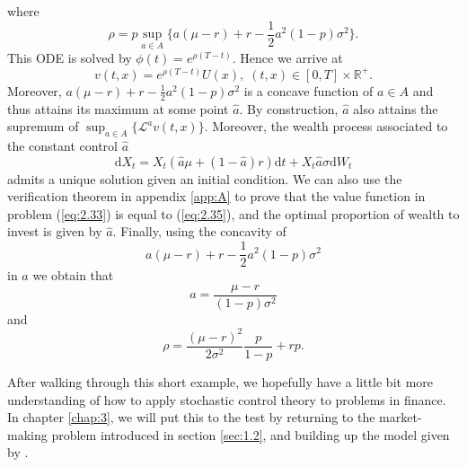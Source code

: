 where 
\begin{equation*}
    \rho=p\sup_{a\in A}\{a(\mu-r)+r-\frac{1}{2}a^2(1-p)\sigma^2\}.
\end{equation*}
This ODE is solved by $\phi(t)=e^{\rho(T-t)}$. Hence we arrive at 
\begin{equation}\label{eq:2.36}
    v(t,x)=e^{\rho(T-t)}U(x),\;(t,x)\in[0,T]\times\mathbb{R}^+.
\end{equation}
Moreover, $a(\mu-r)+r-\frac{1}{2}a^2(1-p)\sigma^2$ is a concave function of $a\in A$
and thus attains its maximum at some point $\hat a$. By construction, $\hat a$ also
attains the supremum of $\sup_{a\in A}\{\mathcal{L}^av(t,x)\}$. Moreover, the wealth
process associated to the constant control $\hat a$
\begin{equation*}
    \mathrm dX_t=X_t(\hat a\mu+(1-\hat a)r)\mathrm dt+X_t\hat a\sigma\mathrm dW_t
\end{equation*}
admits a unique solution given an initial condition. We can also use the verification 
theorem in appendix \ref{app:A} to prove that the value function in problem (\ref{eq:2.33})
is equal to (\ref{eq:2.35}), and the optimal proportion of wealth to invest is given 
by $\hat a$. Finally, using the concavity of 
\begin{equation*}
    a(\mu-r)+r-\frac{1}{2}a^2(1-p)\sigma^2
\end{equation*}
in $a$ we obtain that 
\begin{equation}
    \hat a=\frac{\mu-r}{(1-p)\sigma^2}
\end{equation}
and 
\begin{equation*}
    \rho=\frac{(\mu-r)^2}{2\sigma^2}\frac{p}{1-p}+rp.
\end{equation*}

After walking through this short example, we hopefully have a little bit more understanding
of how to apply stochastic control theory to problems in finance. In chapter \ref{chap:3},
we will put this to the test by returning to the market-making problem introduced in
section \ref{sec:1.2}, and building up the model given by \cite{AS2008}.
